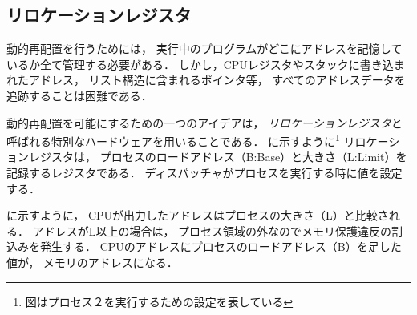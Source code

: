 \subsection{リロケーションレジスタ}
動的再配置を行うためには，
実行中のプログラムがどこにアドレスを記憶しているか全て管理する必要がある．
しかし，CPUレジスタやスタックに書き込まれたアドレス，
リスト構造に含まれるポインタ等，
すべてのアドレスデータを追跡することは困難である．

動的再配置を可能にするための一つのアイデアは，
\emph{リロケーションレジスタ}と呼ばれる特別なハードウェアを用いることである．
に示すように\footnote{
  図はプロセス２を実行するための設定を表している}
リロケーションレジスタは，
プロセスのロードアドレス（B:Base）と大きさ（L:Limit）を記録するレジスタである．
ディスパッチャがプロセスを実行する時に値を設定する．

に示すように，
CPUが出力したアドレスはプロセスの大きさ（L）と比較される．
アドレスがL以上の場合は，
プロセス領域の外なのでメモリ保護違反の割込みを発生する．
CPUのアドレスにプロセスのロードアドレス（B）を足した値が，
メモリのアドレスになる．

